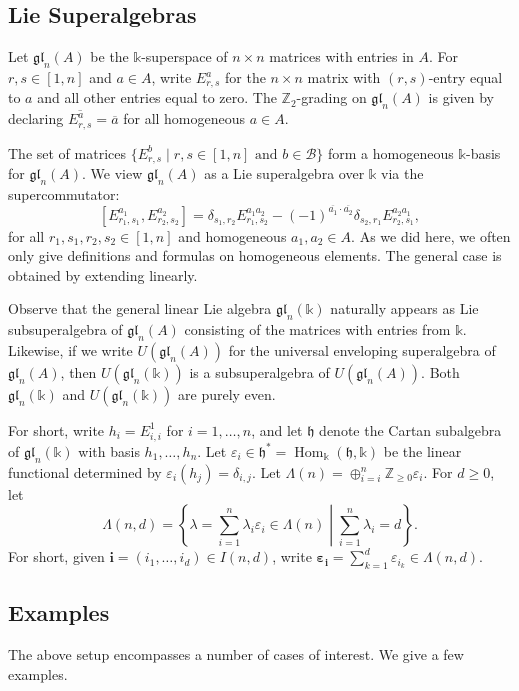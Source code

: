 \documentclass[11pt,reqno]{amsart} %
\newcommand{\Z}{\mathbb{Z}}
\newcommand{\gl}{\mathfrak{gl}}
\renewcommand{\k}{\mathds{k}}
\newcommand{\0}{\bar{0}}
\newcommand{\1}{\bar{1}}
\newcommand{\BasisB}{\mathcal{B}}
\newcommand{\parity}[1]{\overline{#1}}
\newcommand{\Hom}{\operatorname{Hom}}
\newcommand{\bi}{\mathbf{i}}
\newcommand{\bepsilon}{\boldsymbol{\varepsilon}}
\newcommand{\fh}{\mathfrak{h}}
\numberwithin{equation}{subsection}
\begin{document}
\subsection{Lie Superalgebras}\label{SS:LieSuperalgebras}
Let \(\gl_{n}(A)\) be the $\k$-superspace of $n \times n$ matrices with entries in $A$.  For $r,s \in [1,n]$ and $a \in A$, write  \(E_{r,s}^{a}\) for the $n \times n$ matrix with $(r,s)$-entry equal to $a$ and all other entries equal to zero.  The $\Z _{2}$-grading on $\gl_{n}(A)$ is given by declaring $\overline{E_{r,s}^{a}} = \overline{a}$ for all homogeneous $a \in A$.


The set of matrices $\{E_{r,s}^{b} \mid r,s \in [1,n] \text{ and } b \in \BasisB\}$ form a homogeneous $\k$-basis for $\gl_{n}(A)$.  We view $\gl_{n}(A)$ as a Lie superalgebra over $\k$ via the supercommutator:
\begin{equation}\label{E:supercommutator}
[E_{r_{1},s_{1}}^{a_{1}}, E_{r_{2},s_{2}}^{a_{2}}] = \delta_{s_{1}, r_{2}} E_{r_{1},s_{2}}^{a_{1}a_{2}} - (-1)^{\parity{a_{1}}\cdot \parity{a_{2}}} \delta_{s_{2}, r_{1}} E_{r_{2},s_{1}}^{a_{2}a_{1}},
\end{equation}
for all \(r_{1},s_{1}, r_{2}, s_{2} \in [1,n]\) and homogeneous \(a_{1}, a_{2} \in A\).  As we did here, we often only give definitions and formulas on homogeneous elements.  The general case is obtained by extending linearly.

Observe that the general linear Lie algebra $\gl_{n}(\k)$ naturally appears as Lie subsuperalgebra of $\gl_{n}(A)$ consisting of the matrices with entries from $\k$.
 Likewise, if we write \(U(\gl_{n}(A))\) for the universal enveloping superalgebra of \(\gl_n(A)\), then $U(\gl_{n}(\k))$ is a subsuperalgebra of $U(\gl_{n}(A))$.  Both $\gl_{n}(\k )$ and $U(\gl_{n}(\k))$ are purely even.

For short, write $h_{i} = E^{1}_{i,i}$ for $i=1, \dotsc ,n$, and let $\fh$ denote the Cartan subalgebra of $\gl_{n}(\k)$ with basis $h_{1}, \dotsc , h_{n}$.  Let $\varepsilon_{i} \in \fh^{*}= \Hom_{\k}(\fh, \k )$ be the linear functional determined by $\varepsilon_{i}(h_{j}) = \delta_{i,j}$.  Let $\Lambda(n) = \oplus_{i=i}^{n} \Z_{\geq 0}\varepsilon_{i}$.  For $d \geq 0$, let 
\[
\Lambda(n,d) = \left\{\lambda = \sum_{i=1}^{n} \lambda_{i}\varepsilon_{i} \in \Lambda(n) \; \left| \; \sum_{i=1}^{n}\lambda_{i} = d \right.\right\}.
\]
For short, given $\bi = (i_{1}, \dotsc , i_{d}) \in I(n,d)$, write $\bepsilon_{\bi} = \sum_{k=1}^{d} \varepsilon_{i_{k}} \in \Lambda(n,d)$.


\subsection{Examples}\label{SS:Examples} The above setup encompasses a number of cases of interest.  We give a few examples.
\end{document}

